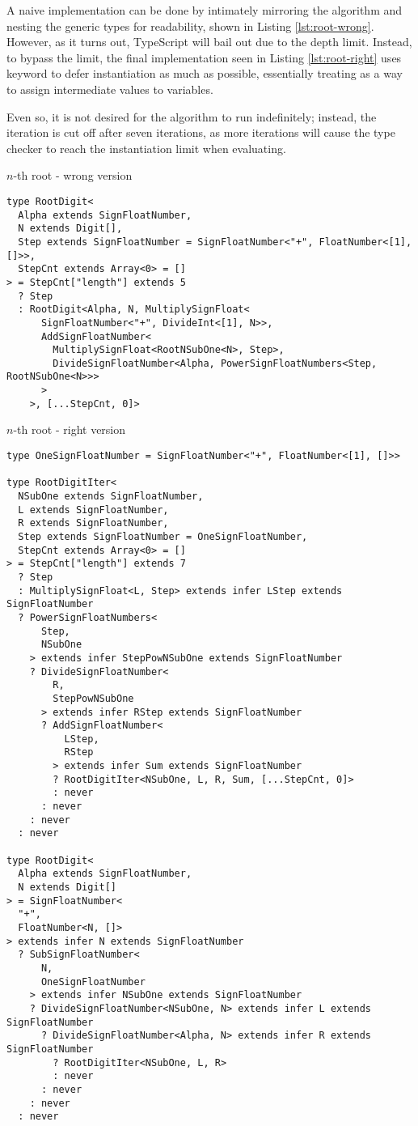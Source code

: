 A naive implementation can be done by intimately mirroring the algorithm and nesting the generic types for readability, shown in Listing \ref{lst:root-wrong}. However, as it turns out, TypeScript will bail out due to the depth limit. Instead, to bypass the limit, the final implementation seen in Listing \ref{lst:root-right} uses  keyword to defer instantiation as much as possible, essentially treating  as a way to assign intermediate values to variables.

Even so, it is not desired for the algorithm to run indefinitely; instead, the iteration is cut off after seven iterations, as more iterations will cause the type checker to reach the instantiation limit when evaluating.

\begin{listing}[ht]
  \caption{$n$-th root - wrong version}\label{lst:root-wrong}
  \begin{verbatim}
type RootDigit<
  Alpha extends SignFloatNumber,
  N extends Digit[],
  Step extends SignFloatNumber = SignFloatNumber<"+", FloatNumber<[1], []>>,
  StepCnt extends Array<0> = []
> = StepCnt["length"] extends 5
  ? Step
  : RootDigit<Alpha, N, MultiplySignFloat<
      SignFloatNumber<"+", DivideInt<[1], N>>,
      AddSignFloatNumber<
        MultiplySignFloat<RootNSubOne<N>, Step>,
        DivideSignFloatNumber<Alpha, PowerSignFloatNumbers<Step, RootNSubOne<N>>>
      >
    >, [...StepCnt, 0]>
\end{verbatim}
\end{listing}

\begin{listing}[ht]
  \caption{$n$-th root - right version}\label{lst:root-right}
  \begin{verbatim}
type OneSignFloatNumber = SignFloatNumber<"+", FloatNumber<[1], []>>

type RootDigitIter<
  NSubOne extends SignFloatNumber,
  L extends SignFloatNumber,
  R extends SignFloatNumber,
  Step extends SignFloatNumber = OneSignFloatNumber,
  StepCnt extends Array<0> = []
> = StepCnt["length"] extends 7
  ? Step
  : MultiplySignFloat<L, Step> extends infer LStep extends SignFloatNumber
  ? PowerSignFloatNumbers<
      Step,
      NSubOne
    > extends infer StepPowNSubOne extends SignFloatNumber
    ? DivideSignFloatNumber<
        R,
        StepPowNSubOne
      > extends infer RStep extends SignFloatNumber
      ? AddSignFloatNumber<
          LStep,
          RStep
        > extends infer Sum extends SignFloatNumber
        ? RootDigitIter<NSubOne, L, R, Sum, [...StepCnt, 0]>
        : never
      : never
    : never
  : never

type RootDigit<
  Alpha extends SignFloatNumber,
  N extends Digit[]
> = SignFloatNumber<
  "+",
  FloatNumber<N, []>
> extends infer N extends SignFloatNumber
  ? SubSignFloatNumber<
      N,
      OneSignFloatNumber
    > extends infer NSubOne extends SignFloatNumber
    ? DivideSignFloatNumber<NSubOne, N> extends infer L extends SignFloatNumber
      ? DivideSignFloatNumber<Alpha, N> extends infer R extends SignFloatNumber
        ? RootDigitIter<NSubOne, L, R>
        : never
      : never
    : never
  : never
\end{verbatim}
\end{listing}
